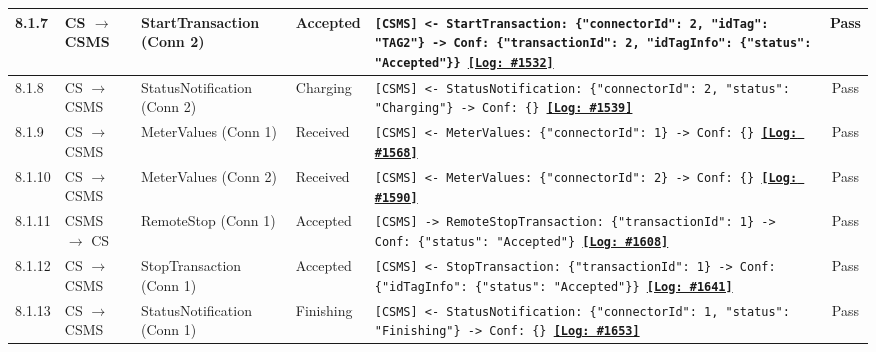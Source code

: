 \documentclass[10pt, a4paper, landscape]{article}
\begin{document}
\begin{longtable}{|p{1.0cm}|p{2.5cm}|p{4.0cm}|p{5.0cm}|p{10.0cm}|c|}
\hline
8.1.7 & CS $\to$ CSMS & StartTransaction (Conn 2) & Accepted & \footnotesize\texttt{[CSMS] <- StartTransaction: \{"connectorId": 2, "idTag": "TAG2"\} \newline [CSMS] -> Conf: \{"transactionId": 2, "idTagInfo": \{"status": "Accepted"\}\} \newline \hyperref[log:8.1.7]{\textbf{[Log: \#1532]}}} & Pass \\
\hline
8.1.8 & CS $\to$ CSMS & StatusNotification (Conn 2) & Charging & \footnotesize\texttt{[CSMS] <- StatusNotification: \{"connectorId": 2, "status": "Charging"\} \newline [CSMS] -> Conf: \{\} \newline \hyperref[log:8.1.8]{\textbf{[Log: \#1539]}}} & Pass \\
\hline
8.1.9 & CS $\to$ CSMS & MeterValues (Conn 1) & Received & \footnotesize\texttt{[CSMS] <- MeterValues: \{"connectorId": 1\} \newline [CSMS] -> Conf: \{\} \newline \hyperref[log:8.1.9]{\textbf{[Log: \#1568]}}} & Pass \\
\hline
8.1.10 & CS $\to$ CSMS & MeterValues (Conn 2) & Received & \footnotesize\texttt{[CSMS] <- MeterValues: \{"connectorId": 2\} \newline [CSMS] -> Conf: \{\} \newline \hyperref[log:8.1.10]{\textbf{[Log: \#1590]}}} & Pass \\
\hline
8.1.11 & CSMS $\to$ CS & RemoteStop (Conn 1) & Accepted & \footnotesize\texttt{[CSMS] -> RemoteStopTransaction: \{"transactionId": 1\} \newline [CS] -> Conf: \{"status": "Accepted"\} \newline \hyperref[log:8.1.11]{\textbf{[Log: \#1608]}}} & Pass \\
\hline
8.1.12 & CS $\to$ CSMS & StopTransaction (Conn 1) & Accepted & \footnotesize\texttt{[CSMS] <- StopTransaction: \{"transactionId": 1\} \newline [CSMS] -> Conf: \{"idTagInfo": \{"status": "Accepted"\}\} \newline \hyperref[log:8.1.12]{\textbf{[Log: \#1641]}}} & Pass \\
\hline
8.1.13 & CS $\to$ CSMS & StatusNotification (Conn 1) & Finishing & \footnotesize\texttt{[CSMS] <- StatusNotification: \{"connectorId": 1, "status": "Finishing"\} \newline [CSMS] -> Conf: \{\} \newline \hyperref[log:8.1.13]{\textbf{[Log: \#1653]}}} & Pass \\

\end{longtable}
\end{document}
